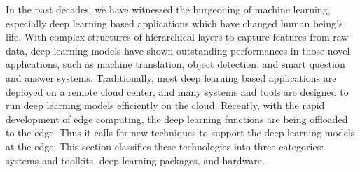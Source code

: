 \label{sec:deep-learning-opt}
In the past decades, we have witnessed the burgeoning of machine learning, especially deep learning based applications which have changed human being's life. With complex structures of hierarchical layers to capture features from raw data, deep learning models have shown outstanding performances in those novel applications, such as machine translation, object detection, and smart question and answer systems.
Traditionally, most deep learning based applications are deployed on a remote cloud center, and many systems and tools are designed to run deep learning models efficiently on the cloud. Recently, with the rapid development of edge computing, the deep learning functions are being offloaded to the edge. Thus it calls for new techniques to support the deep learning models at the edge. This section classifies these technologies into three categories: systems and toolkits, deep learning packages, and hardware.

